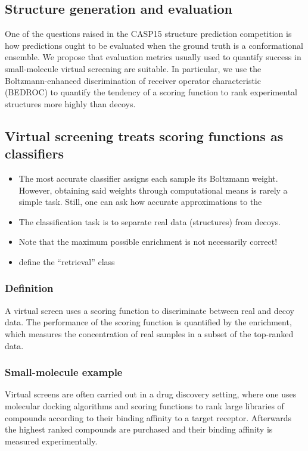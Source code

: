 \documentclass[%
 aip,
 amsmath,amssymb,
 reprint,%
]{revtex4-1}
\begin{document}
\subsection{Structure generation and evaluation}

One of the questions raised in the CASP15 structure prediction competition is how predictions ought to be evaluated when the ground truth is a conformational ensemble. We propose that evaluation metrics usually used to quantify success in small-molecule virtual screening are suitable. In particular, we use the Boltzmann-enhanced discrimination of receiver operator characteristic (BEDROC) to quantify the tendency of a scoring function to rank experimental structures more highly than decoys.

\subsection{Virtual screening treats scoring functions as classifiers}

\begin{itemize}
    \item The most accurate classifier assigns each sample its Boltzmann weight. However, obtaining said weights through computational means is rarely a simple task. Still, one can ask how accurate approximations to the  
    \item The classification task is to separate real data (structures) from decoys.
    \item Note that the maximum possible enrichment is not necessarily correct! 
    \item define the ``retrieval'' class
\end{itemize}


\subsubsection{Definition}

A virtual screen uses a scoring function to discriminate between real and decoy data. The performance of the scoring function is quantified by the enrichment, which measures the concentration of real samples in a subset of the top-ranked data. 

\subsubsection{Small-molecule example}

Virtual screens are often carried out in a drug discovery setting, where one uses molecular docking algorithms and scoring functions to rank large libraries of compounds according to their binding affinity to a target receptor. Afterwards the highest ranked compounds are purchased and their binding affinity is measured experimentally.
\end{document}

